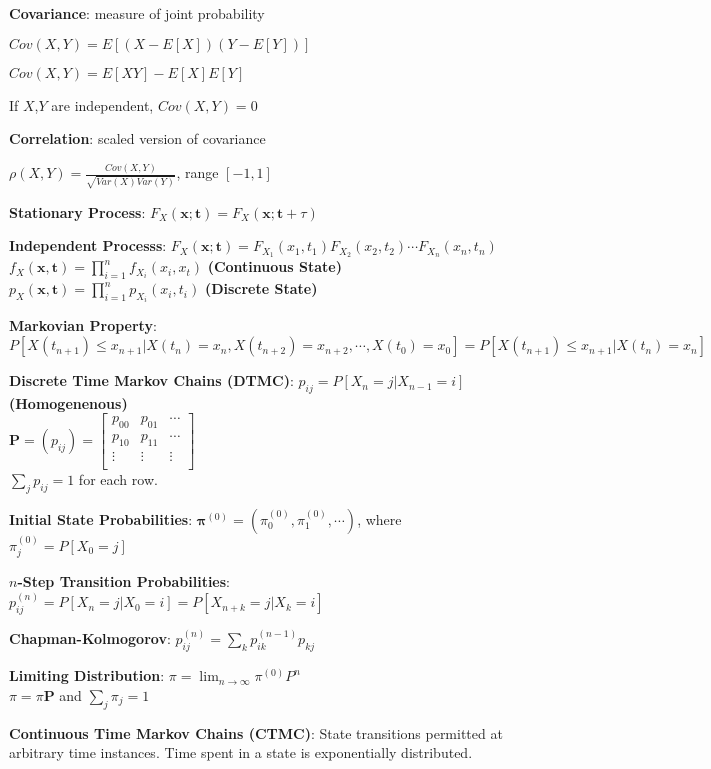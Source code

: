 \documentclass{scrartcl}
\begin{document}
\begin{multicols*}{3}
{\bf Covariance}: measure of joint probability

$Cov(X,Y) = E[(X-E[X])(Y-E[Y])]$

$Cov(X,Y) = E[XY] - E[X]E[Y]$

If $X$,$Y$ are independent, $Cov(X,Y)=0$



{\bf Correlation}: scaled version of covariance

$\rho(X,Y)=\frac{Cov(X,Y)}{\sqrt{Var(X)Var(Y)}}$, range $[-1,1]$


{\bf Stationary Process}: $F_X(\bm{x};\bm{t})=F_X(\bm{x};\bm{t}+\tau)$

{\bf Independent Processs}: $F_X(\bm{x};\bm{t})=F_{X_1}(x_1,t_1)F_{X_2}(x_2,t_2)\cdots F_{X_n}(x_n,t_n)$ \\
$f_X(\bm{x},\bm{t})=\prod_{i=1}^nf_{X_i}(x_i,x_t)$ {\bf (Continuous State)} \\
$p_X(\bm{x},\bm{t})=\prod_{i=1}^np_{X_i}(x_i,t_i)$ {\bf (Discrete State)}

{\bf Markovian Property}: $P[X(t_{n+1})\leq x_{n+1}|X(t_n)=x_n,X(t_{n+2})=x_{n+2},\cdots,X(t_0)=x_0]=P[X(t_{n+1})\leq x_{n+1}|X(t_n)=x_n]$


{\bf Discrete Time Markov Chains (DTMC)}: $p_{ij} = P[X_n=j|X_{n-1}=i]$ {\bf (Homogenenous)} \\
$\bm{P}=(p_{ij})=\begin{bmatrix}
p_{00} & p_{01} & \cdots \\
p_{10} & p_{11} & \cdots \\
\vdots & \vdots & \vdots \\
\end{bmatrix}$\\
$\sum_jp_{ij}=1$ for each row.

{\bf Initial State Probabilities}: $\bm{\pi}^{(0)}=(\pi_0^{(0)},\pi_1^{(0)},\cdots)$, where $\pi_j^{(0)}=P[X_0=j]$

{\bf $n$-Step Transition Probabilities}: $p_{ij}^{(n)}=P[X_n=j|X_0=i]=P[X_{n+k}=j|X_k=i]$

{\bf Chapman-Kolmogorov}: $p_{ij}^{(n)}=\sum_kp_{ik}^{(n-1)}p_{kj}$

{\bf Limiting Distribution}: $\pi=\lim_{n\to\infty}\pi^{(0)}P^n$ \\
$\pi=\pi\bm{P}$ and $\sum_j\pi_j=1$



{\bf Continuous Time Markov Chains (CTMC)}: State transitions permitted at arbitrary time instances. Time spent in a state is exponentially distributed.


\end{multicols*}
\end{document}
